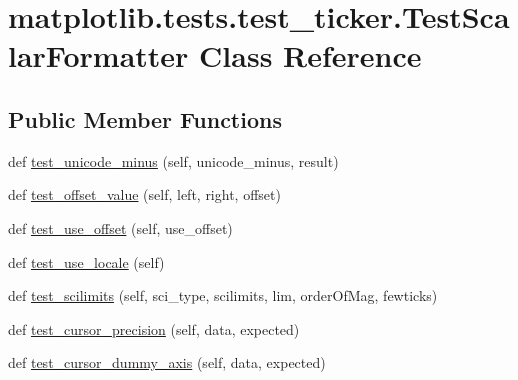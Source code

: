 \hypertarget{classmatplotlib_1_1tests_1_1test__ticker_1_1TestScalarFormatter}{}\section{matplotlib.\+tests.\+test\+\_\+ticker.\+Test\+Scalar\+Formatter Class Reference}
\label{classmatplotlib_1_1tests_1_1test__ticker_1_1TestScalarFormatter}
\subsection*{Public Member Functions}
\begin{DoxyCompactItemize}
\item 
def \hyperlink{classmatplotlib_1_1tests_1_1test__ticker_1_1TestScalarFormatter_a2b7635703d26497aa781be7a226ca337}{test\+\_\+unicode\+\_\+minus} (self, unicode\+\_\+minus, result)
\item 
def \hyperlink{classmatplotlib_1_1tests_1_1test__ticker_1_1TestScalarFormatter_a37b8bbf925cf29bde889e5f4981f740d}{test\+\_\+offset\+\_\+value} (self, left, right, offset)
\item 
def \hyperlink{classmatplotlib_1_1tests_1_1test__ticker_1_1TestScalarFormatter_a43d3a0dc07acdc1433431025624a0b43}{test\+\_\+use\+\_\+offset} (self, use\+\_\+offset)
\item 
def \hyperlink{classmatplotlib_1_1tests_1_1test__ticker_1_1TestScalarFormatter_a0a6ea72af045aa4bdae4a758270ca955}{test\+\_\+use\+\_\+locale} (self)
\item 
def \hyperlink{classmatplotlib_1_1tests_1_1test__ticker_1_1TestScalarFormatter_a98044f76b56dc7cea6488aace65efd7c}{test\+\_\+scilimits} (self, sci\+\_\+type, scilimits, lim, order\+Of\+Mag, fewticks)
\item 
def \hyperlink{classmatplotlib_1_1tests_1_1test__ticker_1_1TestScalarFormatter_af8639d2589c013c8da3d6434234f5669}{test\+\_\+cursor\+\_\+precision} (self, data, expected)
\item 
def \hyperlink{classmatplotlib_1_1tests_1_1test__ticker_1_1TestScalarFormatter_a553470b421d6f3ff18cb0a5efbaa8346}{test\+\_\+cursor\+\_\+dummy\+\_\+axis} (self, data, expected)
\end{DoxyCompactItemize}
